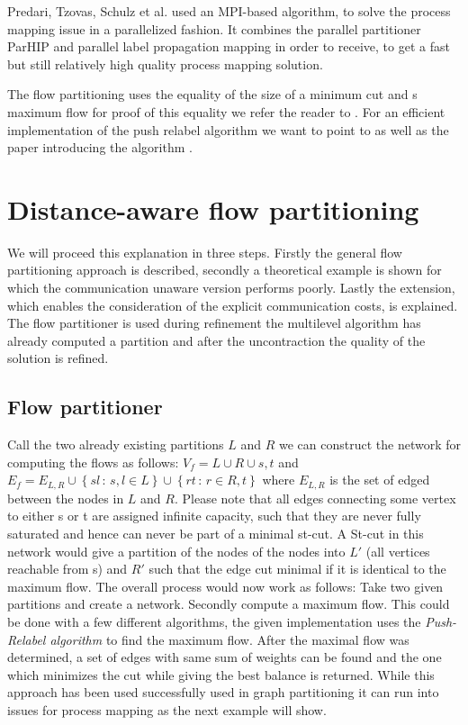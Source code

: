 \documentclass[acmsmall,nonacm,screen,review]{acmart}
\newcommand{\sodass}{\,:\,}
\newcommand{\setGilt}[2]{\left\{ #1\sodass #2\right\}}
\begin{document}
Predari, Tzovas, Schulz et al. \cite{predari2021mpi} used an MPI-based algorithm, to solve the
process mapping issue in a parallelized fashion. It combines the parallel partitioner ParHIP and 
parallel label propagation mapping in order to receive, to get a fast but still relatively high 
quality process mapping solution.

The flow partitioning uses the equality of the size of a minimum cut and s maximum flow for proof
of this equality we refer the reader to \cite{diestel2017flows}. For an efficient implementation
of the push relabel algorithm we want to point to \cite{cherkassky1997implementing} as well 
as the paper introducing the algorithm \cite{goldberg1988new}. 

\section{Distance-aware flow partitioning}
We will proceed this explanation in three steps. Firstly the general flow partitioning approach is
described, secondly a theoretical example is shown for which the communication unaware version 
performs poorly. Lastly the extension, which enables the consideration of the explicit communication
costs, is explained. The flow partitioner is used during refinement the multilevel algorithm 
has already computed a partition and after the uncontraction the quality of the solution is refined.

\subsection*{Flow partitioner}
Call the two already existing partitions $L$ and $R$ we can construct the network for computing the 
flows as follows: $V_f = L \cup R \cup{s,t}$ and $E_f = E_{L,R} \cup \setGilt{sl}{s,l \in L} \cup 
\setGilt{rt}{r \in R, t}$ where $E_{L,R}$ is the set of edged between the nodes in $L$ and $R$.
Please note that all edges connecting some vertex to either s or t are assigned infinite capacity,
such that they are never fully saturated and hence can never be part of a minimal st-cut. 
A St-cut in this network would give a partition of the nodes of the nodes into $L'$ (all vertices 
reachable from s) and $R'$ such that the edge cut minimal if it is identical to the maximum flow.
The overall process would now work as follows: Take two given partitions and create a network. 
Secondly compute a maximum flow. This could be done with a few different algorithms, the given 
implementation uses the \emph{Push-Relabel algorithm} to find the maximum flow. After the maximal
flow was determined, a set of edges with same sum of weights can be found and the one which minimizes 
the cut while giving the best balance is returned. While this approach has been used successfully 
used in graph partitioning it can run into issues for process mapping as the next example will show. 
\end{document}
